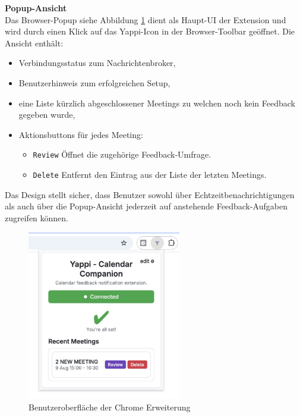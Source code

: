 \documentclass[12pt,a4paper]{report}
\begin{document}
        \textbf{Popup-Ansicht} \\
            Das Browser-Popup siehe Abbildung \ref{fig:yappi-extension-popup} dient als Haupt-UI der Extension und wird durch einen
            Klick auf das Yappi-Icon in der Browser-Toolbar geöffnet.
            Die Ansicht enthält:
            \begin{itemize}
                \item Verbindungsstatus zum Nachrichtenbroker,
                \item Benutzerhinweis zum erfolgreichen Setup,
                \item eine Liste kürzlich abgeschlossener Meetings zu welchen noch kein Feedback gegeben wurde,
                \item Aktionsbuttons für jedes Meeting:
                    \begin{itemize}
                        \item \texttt{Review} Öffnet die zugehörige Feedback-Umfrage.
                        \item \texttt{Delete} Entfernt den Eintrag aus der Liste der letzten Meetings.
                    \end{itemize}
            \end{itemize}
            Das Design stellt sicher, dass Benutzer sowohl über Echtzeitbenachrichtigungen als auch über die Popup-Ansicht
            jederzeit auf anstehende Feedback-Aufgaben zugreifen können.

            \begin{figure}[H]
              \centering
              \includegraphics[width=0.60\textwidth]{../figures/yappi-chrome-extension/yappi-extension-popup.jpg}
              \caption{Benutzeroberfläche der Chrome Erweiterung}
              \label{fig:yappi-extension-popup}
            \end{figure}
\end{document}
